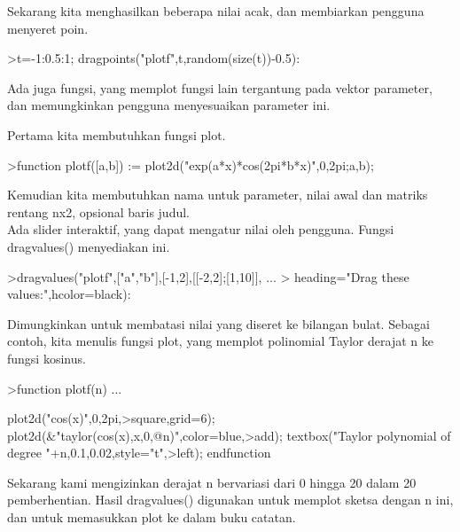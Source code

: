 \documentclass{article}
\begin{document}
\begin{eulernotebook}
\begin{eulercomment}
\begin{eulercomment}
\begin{eulercomment}
\begin{eulercomment}
\begin{eulercomment}
Sekarang kita menghasilkan beberapa nilai acak, dan membiarkan
pengguna menyeret poin.
\end{eulercomment}
\begin{eulerprompt}
>t=-1:0.5:1; dragpoints("plotf",t,random(size(t))-0.5):
\end{eulerprompt}
\begin{eulercomment}
Ada juga fungsi, yang memplot fungsi lain tergantung pada vektor
parameter, dan memungkinkan pengguna menyesuaikan parameter ini.

Pertama kita membutuhkan fungsi plot.
\end{eulercomment}
\begin{eulerprompt}
>function plotf([a,b]) := plot2d("exp(a*x)*cos(2pi*b*x)",0,2pi;a,b);
\end{eulerprompt}
\begin{eulercomment}
Kemudian kita membutuhkan nama untuk parameter, nilai awal dan matriks
rentang nx2, opsional baris judul.\\
Ada slider interaktif, yang dapat mengatur nilai oleh pengguna. Fungsi
dragvalues() menyediakan ini.
\end{eulercomment}
\begin{eulerprompt}
>dragvalues("plotf",["a","b"],[-1,2],[[-2,2];[1,10]], ...
>  heading="Drag these values:",hcolor=black):
\end{eulerprompt}
\begin{eulercomment}
Dimungkinkan untuk membatasi nilai yang diseret ke bilangan bulat.
Sebagai contoh, kita menulis fungsi plot, yang memplot polinomial
Taylor derajat n ke fungsi kosinus.
\end{eulercomment}
\begin{eulerprompt}
>function plotf(n) ...
\end{eulerprompt}
\begin{eulerudf}
  plot2d("cos(x)",0,2pi,>square,grid=6);
  plot2d(&"taylor(cos(x),x,0,@n)",color=blue,>add);
  textbox("Taylor polynomial of degree "+n,0.1,0.02,style="t",>left);
  endfunction
\end{eulerudf}
\begin{eulercomment}
Sekarang kami mengizinkan derajat n bervariasi dari 0 hingga 20 dalam
20 pemberhentian. Hasil dragvalues() digunakan untuk memplot sketsa
dengan n ini, dan untuk memasukkan plot ke dalam buku catatan.
\end{eulercomment}
\begin{eulerprompt}

\end{eulerprompt}
\end{eulercomment}
\end{eulercomment}
\end{eulercomment}
\end{eulercomment}
\end{eulernotebook}
\end{document}
